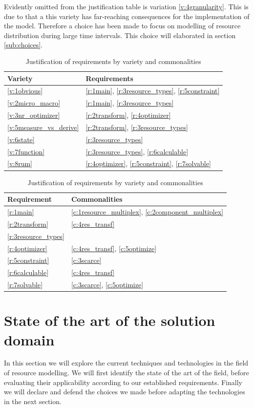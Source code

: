 Evidently omitted from the justification table is variation \ref{v:4granularity}. This is due to that a this variety has far-reaching consequences for the implementation of the model. Therefore a choice has been made to focus on modelling of resource distribution during large time intervals. This choice will elaborated in section \ref{sub:choices}.
\begin{table}
\centering
\begin{tabular}{|l|l|} \hline
Variety & Requirements \\ \hline
\ref{v:1obvious} & \ref{r:1main}, \ref{r:3resource_types}, \ref{r:5constraint}		\\ \hline
\ref{v:2micro_macro} & \ref{r:1main}, \ref{r:3resource_types} 	\\ \hline
\ref{v:3nr_optimizer} & \ref{r:2transform}, \ref{r:4optimizer} 	\\ \hline
\ref{v:5measure_vs_derive} & \ref{r:2transform}, \ref{r:3resource_types} \\ 	\hline
\ref{v:6state} & \ref{r:3resource_types} 	\\ \hline
\ref{v:7function} & \ref{r:3resource_types}, \ref{r:6calculable} 	\\ \hline
\ref{v:8rum} & \ref{r:4optimizer}, \ref{r:5constraint}, \ref{r:7solvable} 	\\ \hline
\end{tabular}
\hspace{24px}
\begin{tabular}{|l|l|} \hline
Requirement & Commonalities \\ \hline
\ref{r:1main} & \ref{c:1resource_multiplex}, \ref{c:2component_multiplex}	\\ \hline
\ref{r:2transform} & \ref{c:4res_transf}	\\ \hline
\ref{r:3resource_types} &	\\ \hline
\ref{r:4optimizer} & \ref{c:4res_transf}, \ref{c:5optimize} 	\\ \hline
\ref{r:5constraint} & \ref{c:3scarce}	\\ \hline
\ref{r:6calculable} & \ref{c:4res_transf}	\\ \hline
\ref{r:7solvable} & \ref{c:3scarce}, \ref{c:5optimize}	\\ \hline
\end{tabular}
\caption{Justification of requirements by variety and commonalities}
\label{table:justification}
\end{table}

\section{State of the art of the solution domain}
In this section we will explore the current techniques and technologies in the field of resource modelling. We will first identify the state of the art of the field, before evaluating their applicability according to our established requirements. Finally we will declare and defend the choices we made before adapting the technologies in the next section.

